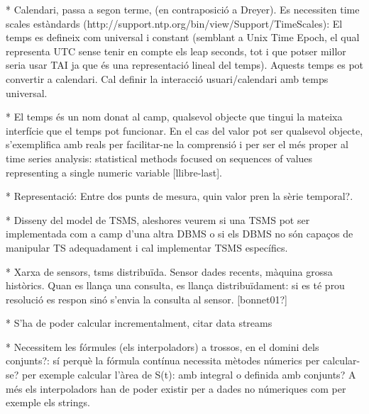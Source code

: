 * Calendari, passa a segon terme, (en contraposició a Dreyer). Es necessiten time scales estàndards (http://support.ntp.org/bin/view/Support/TimeScales): El temps es defineix com universal i constant (semblant a Unix Time Epoch, el qual representa UTC sense tenir en compte els leap seconds, tot i que potser millor seria usar TAI ja que és una representació lineal del temps). Aquests temps es pot convertir a calendari. Cal definir la interacció usuari/calendari amb temps universal.

* El temps és un nom donat al camp, qualsevol objecte que tingui la mateixa interfície que el temps pot funcionar. En el cas del valor pot ser qualsevol objecte, s'exemplifica amb reals per facilitar-ne la comprensió i per ser el més proper al time series analysis: statistical methods focused on sequences of values representing a single numeric variable [llibre-last].




* Representació: Entre dos punts de mesura, quin valor pren la sèrie temporal?.


* Disseny del model de TSMS, aleshores veurem si una TSMS pot ser implementada com a camp d'una altra DBMS o si els DBMS no són capaços de manipular TS adequadament i cal implementar TSMS específics.

* Xarxa de sensors, tsms distribuïda. Sensor dades recents, màquina grossa històrics. Quan es llança una consulta, es llança distribuïdament: si es té prou resolució es respon sinó s'envia la consulta al sensor. [bonnet01?]

* S'ha de poder calcular incrementalment, citar data streams

* Necessitem les fórmules (els interpoladors) a trossos, en el domini dels conjunts?: sí perquè la fórmula contínua necessita mètodes númerics per calcular-se? per exemple calcular l'àrea de S(t): amb integral o definida amb conjunts?
A més els interpoladors han de poder existir per a dades no númeriques com per exemple els strings.








